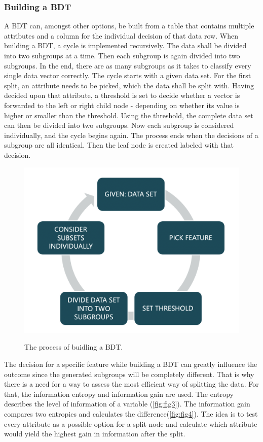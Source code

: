 \documentclass[
12pt,
headsepline,
bibliography=totoc,
twoside=semi,
fleqn
]{scrartcl}
\begin{document}
 \subsubsection{Building a BDT\label{sec:sec2-1-2}}
 A BDT can, amongst other options, be built from a table that contains multiple attributes and a column for the individual decision of that data row. When building a BDT, a cycle is implemented recursively. The data shall be divided into two subgroups at a time. Then each subgroup is again divided into two subgroups. In the end, there are as many subgroups as it takes to classify every single data vector correctly. The cycle starts with a given data set. For the first split, an attribute needs to be picked, which the data shall be split with. Having decided upon that attribute, a threshold is set to decide whether a vector is forwarded to the left or right child node - depending on whether its value is higher or smaller than the threshold. Using the threshold, the complete data set can then be divided into two subgroups. Now each subgroup is considered individually, and the cycle begins again. The process ends when the decisions of a subgroup are all identical. Then the leaf node is created labeled with that decision. 

 \begin{figure}[H]
 \centering \includegraphics[scale=0.55]{BDT2.png}\label{fig:fig2}
 \caption{The process of buidling a BDT.}
 \end{figure}


 The decision for a specific feature while building a BDT can greatly influence the outcome since the generated subgroups will be completely different. That is why there is a need for a way to assess the most efficient way of splitting the data. For that, the information entropy and information gain are used. The entropy describes the level of information of a variable (\ref{fig:fig3}). The information gain compares two entropies and calculates the difference(\ref{fig:fig4}). The idea is to test every attribute as a possible option for a split node and calculate which attribute would yield the highest gain in information after the split. 
\end{document}
